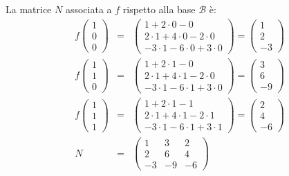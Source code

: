 \documentclass[a4paper]{article}
\begin{document}
	\noindent
	La matrice $N$ associata a $f$ rispetto alla base $\mathcal{B}$ è:
	\begin{equation*}
		\begin{array}{rll}
			f\begin{pmatrix}
				1 \\ 0 \\ 0
			\end{pmatrix} &=& \begin{pmatrix}
				1 + 2 \cdot 0 - 0 \\
				2 \cdot 1 + 4 \cdot 0 - 2 \cdot 0 \\
				-3 \cdot 1 - 6 \cdot 0 + 3 \cdot 0
			\end{pmatrix} = \begin{pmatrix}
				1 \\ 2 \\ -3
			\end{pmatrix} \\ [2em]
			f\begin{pmatrix}
				1 \\ 1 \\ 0
			\end{pmatrix} &=& \begin{pmatrix}
				1 + 2 \cdot 1 - 0 \\
				2 \cdot 1 + 4 \cdot 1 - 2 \cdot 0 \\
				-3 \cdot 1 - 6 \cdot 1 + 3 \cdot 0
			\end{pmatrix} = \begin{pmatrix}
				3 \\ 6 \\ -9
			\end{pmatrix} \\ [2em]
			f\begin{pmatrix}
				1 \\ 1 \\ 1
			\end{pmatrix} &=& \begin{pmatrix}
				1 + 2 \cdot 1 - 1 \\
				2 \cdot 1 + 4 \cdot 1 - 2 \cdot 1 \\
				-3 \cdot 1 - 6 \cdot 1 + 3 \cdot 1
			\end{pmatrix} = \begin{pmatrix}
				2 \\ 4 \\ -6
			\end{pmatrix} \\ [2em]
			N &=& \begin{pmatrix}
				1	& 3		& 2		\\
				2	& 6		& 4		\\
				-3	& -9	& -6
			\end{pmatrix}
		\end{array}
	\end{equation*}\newpage
\end{document}
